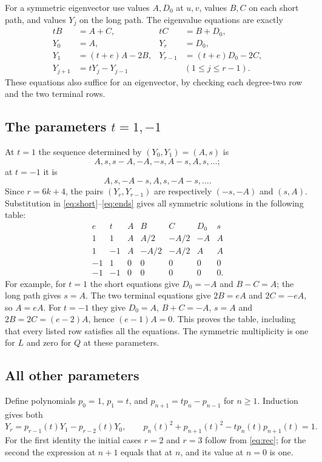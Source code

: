 \documentclass[11pt]{article}
\begin{document}
For a symmetric eigenvector use values $A,D_0$ at $u,v$, values $B,C$
on each short path, and values $Y_j$ on the long path. The eigenvalue
equations are exactly
\begin{align}
 tB&=A+C,&tC&=B+D_0,\label{eq:short}\\
 Y_0&=A,&Y_r&=D_0,\nonumber\\
 Y_1&=(t+e)A-2B,&Y_{r-1}&=(t+e)D_0-2C,\label{eq:ends}\\
 Y_{j+1}&=tY_j-Y_{j-1}&&(1\leq j\leq r-1).\label{eq:rec}
\end{align}
These equations also suffice for an eigenvector, by checking each
degree-two row and the two terminal rows.

\subsection{The parameters \texorpdfstring{$t=1,-1$}{t = 1, -1}}
At $t=1$ the sequence determined by $(Y_0,Y_1)=(A,s)$ is
\[
 A,s,s-A,-A,-s,A-s,A,s,\ldots;
\]
at $t=-1$ it is
\[
 A,s,-A-s,A,s,-A-s,\ldots.
\]
Since $r=6k+4$, the pairs $(Y_r,Y_{r-1})$ are respectively
$(-s,-A)$ and $(s,A)$. Substitution in \eqref{eq:short}--\eqref{eq:ends}
gives all symmetric solutions in the following table:
\[
\begin{array}{cc|ccccc}
 e&t&A&B&C&D_0&s\\\hline
 1&1&A&A/2&-A/2&-A&A\\
 1&-1&A&-A/2&-A/2&A&A\\
 -1&1&0&0&0&0&0\\
 -1&-1&0&0&0&0&0.
\end{array}
\]
For example, for $t=1$ the short equations give $D_0=-A$ and $B-C=A$;
the long path gives $s=A$. The two terminal equations give
$2B=eA$ and $2C=-eA$, so $A=eA$.
For $t=-1$ they give $D_0=A$, $B+C=-A$, $s=A$ and
$2B=2C=(e-2)A$, hence $(e-1)A=0$.
This proves the table, including that every listed row satisfies all
the equations. The symmetric multiplicity is one for $L$ and zero
for $Q$ at these parameters.

\subsection{All other parameters}
Define polynomials $p_0=1$, $p_1=t$, and
$p_{n+1}=tp_n-p_{n-1}$ for $n\geq1$.
Induction gives both
\begin{equation}\label{eq:cont}
 Y_r=p_{r-1}(t)Y_1-p_{r-2}(t)Y_0,\qquad
 p_n(t)^2+p_{n+1}(t)^2-tp_n(t)p_{n+1}(t)=1.
\end{equation}
For the first identity the initial cases $r=2$ and $r=3$ follow from
\eqref{eq:rec}; for the second the expression at $n+1$ equals that at
$n$, and its value at $n=0$ is one.
\end{document}
